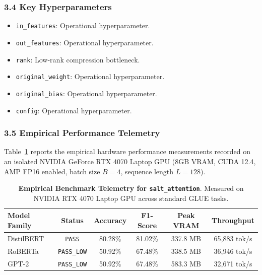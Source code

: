 \subsubsection*{3.4 Key Hyperparameters}
\begin{itemize}
    \item \texttt{in\_features}: Operational hyperparameter.
    \item \texttt{out\_features}: Operational hyperparameter.
    \item \texttt{rank}: Low-rank compression bottleneck.
    \item \texttt{original\_weight}: Operational hyperparameter.
    \item \texttt{original\_bias}: Operational hyperparameter.
    \item \texttt{config}: Operational hyperparameter.
\end{itemize}

\subsubsection*{3.5 Empirical Performance Telemetry}
Table~\ref{tab:telemetry_salt_attention} reports the empirical hardware performance measurements recorded on an isolated NVIDIA GeForce RTX 4070 Laptop GPU (8GB VRAM, CUDA 12.4, AMP FP16 enabled, batch size $B=4$, sequence length $L=128$).

\begin{table}[h]
\centering
\small
\caption{\textbf{Empirical Benchmark Telemetry for \texttt{salt\_attention}}. Measured on NVIDIA RTX 4070 Laptop GPU across standard GLUE tasks.}
\label{tab:telemetry_salt_attention}
\begin{tabular*}{\columnwidth}{@{\extracolsep{\fill}}lccccc}
\toprule
\textbf{Model Family} & \textbf{Status} & \textbf{Accuracy} & \textbf{F1-Score} & \textbf{Peak VRAM} & \textbf{Throughput} \\
\midrule
DistilBERT & \texttt{PASS} & 80.28\% & 81.02\% & 337.8 MB & 65,883 tok/s \\
RoBERTa & \texttt{PASS\_LOW} & 50.92\% & 67.48\% & 338.5 MB & 36,946 tok/s \\
GPT-2 & \texttt{PASS\_LOW} & 50.92\% & 67.48\% & 583.3 MB & 32,671 tok/s \\
\bottomrule
\end{tabular*}
\end{table}


